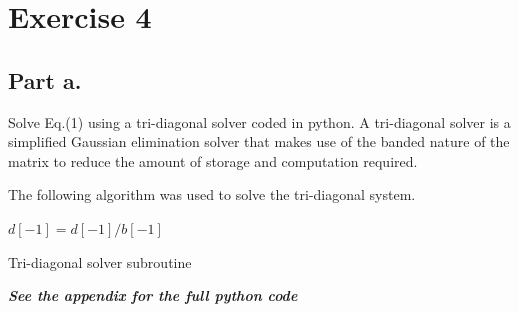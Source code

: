 \section{Exercise 4}
\subsection{Part a.}
Solve Eq.(1) using a tri-diagonal solver coded in python. A tri-diagonal
solver is a simplified Gaussian elimination solver that makes use of the
banded nature of the matrix to reduce the amount of storage and computation
required.

\begin{mdframed}[style=MyFrame]
    The following algorithm was used to solve the tri-diagonal system. 

    \begin{algorithm}[H]
        \DontPrintSemicolon
        \SetAlgoLined
        \BlankLine
            $d[-1] = d[-1]/b[-1]$\;
        \caption{Tri-diagonal solver subroutine}
    \end{algorithm}

    \emph{\textbf{See the appendix for the full python code}}
\end{mdframed}

